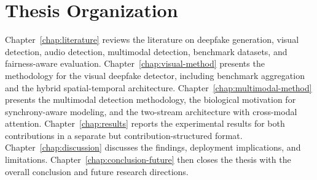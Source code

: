 \section{Thesis Organization}

Chapter~\ref{chap:literature} reviews the literature on deepfake generation, visual detection, audio detection, multimodal detection, benchmark datasets, and fairness-aware evaluation. Chapter~\ref{chap:visual-method} presents the methodology for the visual deepfake detector, including benchmark aggregation and the hybrid spatial-temporal architecture. Chapter~\ref{chap:multimodal-method} presents the multimodal detection methodology, the biological motivation for synchrony-aware modeling, and the two-stream architecture with cross-modal attention. Chapter~\ref{chap:results} reports the experimental results for both contributions in a separate but contribution-structured format. Chapter~\ref{chap:discussion} discusses the findings, deployment implications, and limitations. Chapter~\ref{chap:conclusion-future} then closes the thesis with the overall conclusion and future research directions.